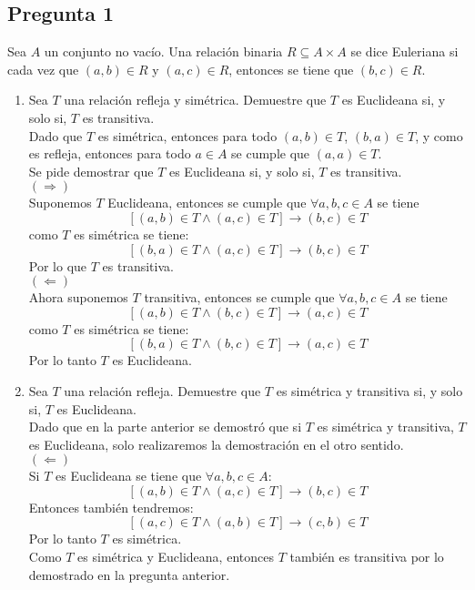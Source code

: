 \documentclass[letter]{article}
\begin{document}
	
	\begin{pregunta}{1} %
		\section*{Pregunta 1}
		Sea $A$ un conjunto no vacío. Una relación binaria $R\subseteq A \times A$ se dice Euleriana si cada vez que $(a, b) \in R$ y $(a,c) \in R$, entonces se tiene que $(b,c) \in R$.
		\begin{enumerate}
		\item Sea $T$ una relación refleja y simétrica. Demuestre que $T$ es Euclideana si, y solo si, $T$ es transitiva.\\
		
		Dado que $T$ es simétrica, entonces para todo $(a,b) \in T$, $(b,a) \in T$, y como es refleja, entonces para todo $a\in A$ se cumple que $(a,a)\in T$.\\
		Se pide demostrar que $T$ es Euclideana si, y solo si, $T$ es transitiva.\\
		$(\Rightarrow)$\\
		Suponemos $T$ Euclideana, entonces se cumple que $\forall a,b,c \in A$ se tiene 
		$$ \left[(a,b)\in T\wedge(a,c) \in T\right]\rightarrow (b,c)\in T$$ 
		como $T$ es simétrica se tiene:
		$$ \left[(b,a)\in T\wedge(a,c) \in T\right]\rightarrow (b,c)\in T$$ 
		Por lo que $T$ es transitiva.\\
		$(\Leftarrow)$\\
		Ahora suponemos $T$ transitiva, entonces se cumple que $\forall a,b,c \in A$ se tiene 
		$$ \left[(a,b)\in T\wedge(b,c) \in T\right]\rightarrow (a,c)\in T$$ 
		como $T$ es simétrica se tiene:
		$$ \left[(b,a)\in T\wedge(b,c) \in T\right]\rightarrow (a,c)\in T$$ 
		Por lo tanto $T$ es Euclideana.
		
		\item Sea $T$ una relación refleja. Demuestre que $T$ es simétrica y transitiva si, y solo si, $T$ es Euclideana.\\
		
		Dado que en la parte anterior se demostró que si $T$ es simétrica y transitiva, $T$ es Euclideana, solo realizaremos la demostración en el otro sentido.\\
		$(\Leftarrow)$\\
		Si $T$ es Euclideana se tiene que 
		$\forall a,b,c \in A$:
		$$ \left[(a,b)\in T\wedge(a,c) \in T\right]\rightarrow (b,c)\in T$$
		Entonces también tendremos:
		$$ \left[(a,c)\in T\wedge(a,b) \in T\right]\rightarrow (c,b)\in T$$
		Por lo tanto $T$ es simétrica.\\
		Como $T$ es simétrica y Euclideana, entonces $T$ también es transitiva por lo demostrado en la pregunta anterior.
		\end{enumerate}
		
	\end{pregunta}
	
\end{document}
